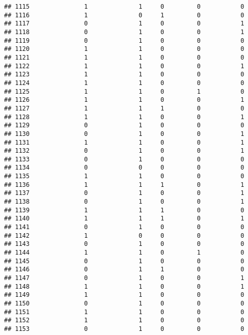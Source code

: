 \documentclass[]{article}
\begin{document}
\begin{verbatim}
## 1115               1              1     0         0           0
## 1116               1              0     1         0           0
## 1117               0              1     0         0           1
## 1118               0              1     0         0           1
## 1119               0              1     0         0           0
## 1120               1              1     0         0           0
## 1121               1              1     0         0           0
## 1122               1              1     0         0           1
## 1123               1              1     0         0           0
## 1124               1              1     0         0           0
## 1125               1              1     0         1           0
## 1126               1              1     0         0           1
## 1127               1              1     1         0           0
## 1128               1              1     0         0           1
## 1129               0              1     0         0           0
## 1130               0              1     0         0           1
## 1131               1              1     0         0           1
## 1132               0              1     0         0           1
## 1133               0              1     0         0           0
## 1134               0              0     0         0           0
## 1135               1              1     0         0           0
## 1136               1              1     1         0           1
## 1137               0              1     0         0           1
## 1138               0              1     0         0           1
## 1139               1              1     1         0           0
## 1140               1              1     1         0           1
## 1141               0              1     0         0           0
## 1142               1              0     0         0           0
## 1143               0              1     0         0           0
## 1144               1              1     0         1           0
## 1145               0              1     0         0           0
## 1146               0              1     1         0           0
## 1147               0              1     0         0           1
## 1148               1              1     0         0           1
## 1149               1              1     0         0           0
## 1150               0              1     0         0           0
## 1151               1              1     0         0           0
## 1152               1              1     0         0           0
## 1153               0              1     0         0           0

\end{verbatim}
\end{document}
